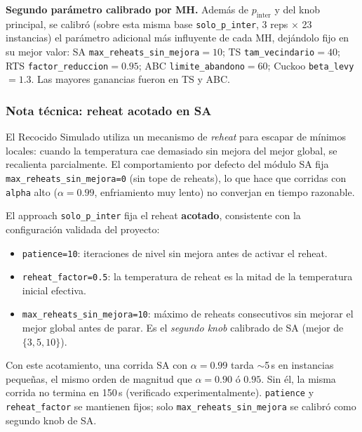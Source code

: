 \medskip
\noindent\textbf{Segundo parámetro calibrado por MH.} Además de
$p_{\text{inter}}$ y del knob principal, se calibró (sobre esta misma base
\texttt{solo\_p\_inter}, 3 reps $\times$ 23 instancias) el parámetro adicional
más influyente de cada MH, dejándolo fijo en su mejor valor: SA
\texttt{max\_reheats\_sin\_mejora}$=10$; TS \texttt{tam\_vecindario}$=40$; RTS
\texttt{factor\_reduccion}$=0.95$; ABC \texttt{limite\_abandono}$=60$; Cuckoo
\texttt{beta\_levy}$=1.3$. Las mayores ganancias fueron en TS y ABC.

\subsubsection*{Nota técnica: reheat acotado en SA}
\label{nota:reheat-acotado-solo-p-inter}

El Recocido Simulado utiliza un mecanismo de \emph{reheat} para
escapar de mínimos locales: cuando la temperatura cae demasiado sin
mejora del mejor global, se recalienta parcialmente. El comportamiento
por defecto del módulo SA fija \texttt{max\_reheats\_sin\_mejora=0}
(sin tope de reheats), lo que hace que corridas con \texttt{alpha}
alto ($\alpha = 0.99$, enfriamiento muy lento) no converjan en tiempo
razonable.

El approach \texttt{solo\_p\_inter} fija el reheat \textbf{acotado},
consistente con la configuración validada del proyecto:

\begin{itemize}
  \item \texttt{patience=10}: iteraciones de nivel sin mejora antes
    de activar el reheat.
  \item \texttt{reheat\_factor=0.5}: la temperatura de reheat es la
    mitad de la temperatura inicial efectiva.
  \item \texttt{max\_reheats\_sin\_mejora=10}: máximo de reheats
    consecutivos sin mejorar el mejor global antes de parar. Es el
    \emph{segundo knob} calibrado de SA (mejor de $\{3,5,10\}$).
\end{itemize}

Con este acotamiento, una corrida SA con $\alpha = 0.99$ tarda
$\sim$5\,s en instancias pequeñas, el mismo orden de magnitud que
$\alpha = 0.90$ ó $0.95$. Sin él, la misma corrida no termina en
150\,s (verificado experimentalmente). \texttt{patience} y
\texttt{reheat\_factor} se mantienen fijos; solo
\texttt{max\_reheats\_sin\_mejora} se calibró como segundo knob de SA.

